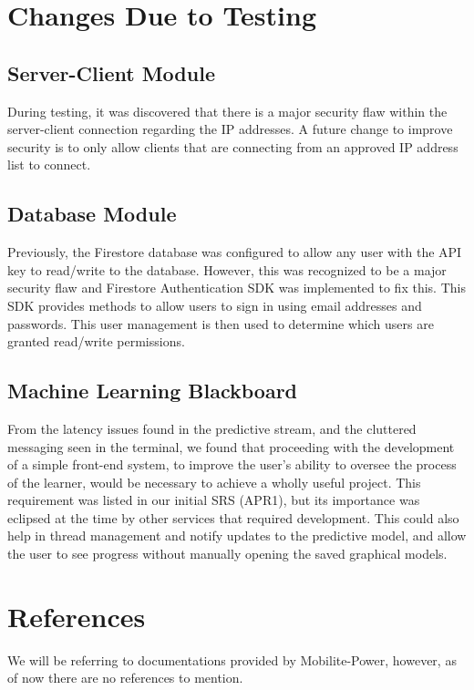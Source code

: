\documentclass[12pt, titlepage]{article}
\begin{document}
\section{Changes Due to Testing}
\subsection{Server-Client Module}
During testing, it was discovered that there is a major security flaw within the server-client connection regarding the IP addresses. A future change to improve security is to only allow clients that are connecting from an approved IP address list to connect.

\subsection{Database Module}
Previously, the Firestore database was configured to allow any user with the API key to read/write to the database. However, this was recognized to be a major security flaw and Firestore Authentication SDK was implemented to fix this. This SDK provides methods to allow users to sign in using email addresses and passwords. This user management is then used to determine which users are granted read/write permissions.

\subsection{Machine Learning Blackboard}
From the latency issues found in the predictive stream, and the cluttered messaging seen in the terminal, we found that proceeding with the development of a simple front-end system, to improve the user's ability to oversee the process of the learner, would be necessary to achieve a wholly useful project. This requirement was listed in our initial SRS (APR1), but its importance was eclipsed at the time by other services that required development. This could also help in thread management and notify updates to the predictive model, and allow the user to see progress without manually opening the saved graphical models.



\section*{References}
We will be referring to documentations provided by Mobilite-Power, however, as of now there are no references to mention.
\end{document}
